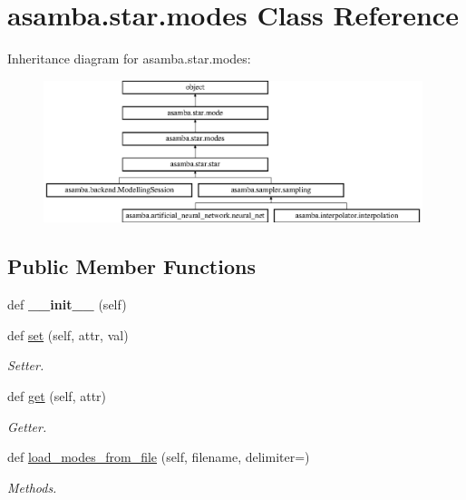 \hypertarget{classasamba_1_1star_1_1modes}{}\section{asamba.\+star.\+modes Class Reference}
\label{classasamba_1_1star_1_1modes}
Inheritance diagram for asamba.\+star.\+modes\+:\begin{figure}[H]
\begin{center}
\leavevmode
\includegraphics[height=4.148148cm]{classasamba_1_1star_1_1modes}
\end{center}
\end{figure}
\subsection*{Public Member Functions}
\begin{DoxyCompactItemize}
\item 
\mbox{\label{classasamba_1_1star_1_1modes_abce4d33b22e4f51db250c3e384591be6}} 
def {\bfseries \+\_\+\+\_\+init\+\_\+\+\_\+} (self)
\item 
\mbox{\label{classasamba_1_1star_1_1modes_a86f1dd21b0af24cc60d521fbeb391ef8}} 
def \hyperlink{classasamba_1_1star_1_1modes_a86f1dd21b0af24cc60d521fbeb391ef8}{set} (self, attr, val)
\begin{DoxyCompactList}\small\item\em Setter. \end{DoxyCompactList}\item 
\mbox{\label{classasamba_1_1star_1_1modes_a4bf25d680e466f4e888b3a63df76281d}} 
def \hyperlink{classasamba_1_1star_1_1modes_a4bf25d680e466f4e888b3a63df76281d}{get} (self, attr)
\begin{DoxyCompactList}\small\item\em Getter. \end{DoxyCompactList}\item 
def \hyperlink{classasamba_1_1star_1_1modes_a5164b765f3ed46300e4c5a1970f2c784}{load\+\_\+modes\+\_\+from\+\_\+file} (self, filename, delimiter=\textquotesingle{}\textquotesingle{})
\begin{DoxyCompactList}\small\item\em Methods. \end{DoxyCompactList}\end{DoxyCompactItemize}
